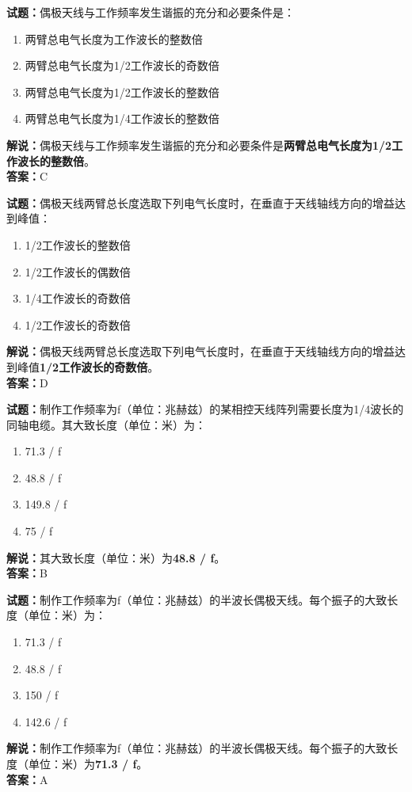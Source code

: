 \documentclass{ctexbook}
\begin{document}
\bigskip


\noindent\textbf{试题：}偶极天线与工作频率发生谐振的充分和必要条件是：
\begin{enumerate}[leftmargin=3em]
\item 两臂总电气长度为工作波长的整数倍
\item 两臂总电气长度为1/2工作波长的奇数倍
\item 两臂总电气长度为1/2工作波长的整数倍
\item 两臂总电气长度为1/4工作波长的整数倍
\end{enumerate}
\noindent\textbf{解说：}偶极天线与工作频率发生谐振的充分和必要条件是\textbf{两臂总电气长度为1/2工作波长的整数倍}。\\\noindent\textbf{答案：}C



\bigskip


\noindent\textbf{试题：}偶极天线两臂总长度选取下列电气长度时，在垂直于天线轴线方向的增益达到峰值：
\begin{enumerate}[leftmargin=3em]
\item 1/2工作波长的整数倍
\item 1/2工作波长的偶数倍
\item 1/4工作波长的奇数倍
\item 1/2工作波长的奇数倍
\end{enumerate}
\noindent\textbf{解说：}偶极天线两臂总长度选取下列电气长度时，在垂直于天线轴线方向的增益达到峰值\textbf{1/2工作波长的奇数倍}。\\\noindent\textbf{答案：}D



\bigskip


\noindent\textbf{试题：}制作工作频率为f（单位：兆赫兹）的某相控天线阵列需要长度为1/4波长的同轴电缆。其大致长度（单位：米）为： 
\begin{enumerate}[leftmargin=3em]
\item 71.3 / f
\item 48.8 / f
\item 149.8 / f
\item 75 / f
\end{enumerate}
\noindent\textbf{解说：}其大致长度（单位：米）为\textbf{48.8 / f}。\\\noindent\textbf{答案：}B


\bigskip


\noindent\textbf{试题：}制作工作频率为f（单位：兆赫兹）的半波长偶极天线。每个振子的大致长度（单位：米）为：
\begin{enumerate}[leftmargin=3em]
\item 71.3 / f
\item 48.8 / f
\item 150 / f
\item 142.6 / f
\end{enumerate}
\noindent\textbf{解说：}制作工作频率为f（单位：兆赫兹）的半波长偶极天线。每个振子的大致长度（单位：米）为\textbf{71.3 / f}。\\\noindent\textbf{答案：}A
\end{document}
